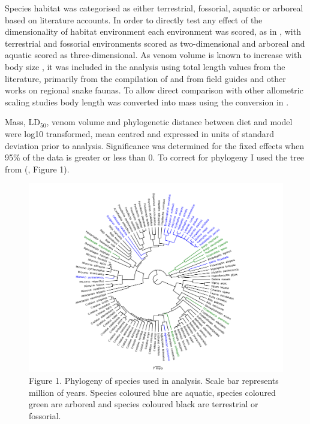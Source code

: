 Species habitat was categorised as either terrestrial, fossorial, aquatic or arboreal based on literature accounts. In order to directly test any effect of the dimensionality of habitat environment each environment was scored, as in \cite{pawar2012dimensionality}, with terrestrial and fossorial environments scored as two-dimensional and arboreal and aquatic scored as three-dimensional.
As venom volume is known to increase with body size \citep{mirtschin2002influences}, it was included in the analysis using total length values from the literature, primarily from the compilation of \citep{boback2003empirical} and from field guides and other works on regional snake faunas. To allow direct comparison with other allometric scaling studies body length was converted into mass using the conversion in \citep{boback2003empirical}. 


Mass, LD$_{50}$, venom volume and phylogenetic distance between diet and model were log10 transformed, mean centred and expressed in units of standard deviation prior to analysis. Significance was determined for the fixed effects when 95\% of the data is greater or less than 0. To correct for phylogeny I used the tree from (\cite{pyron2014early}, Figure 1). 


\begin{figure}[h]
  \centering
  \includegraphics[width=.95\textwidth]{ch4-snakes/fig1_snake_phylo.pdf}%
  \caption[ ]{Figure 1. Phylogeny of species used in analysis. Scale bar represents million of years. Species coloured blue are aquatic, species coloured green are arboreal and species coloured black are terrestrial or fossorial.}
  \label{fig:Figure 1.}
\end{figure}


